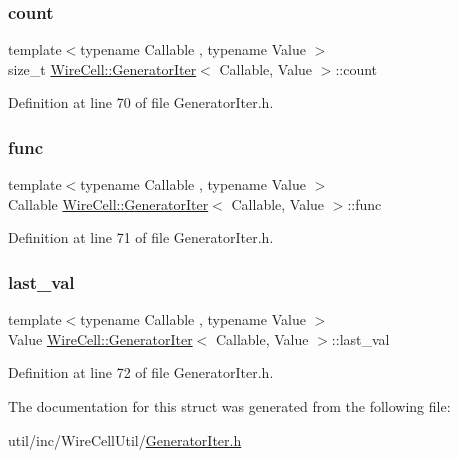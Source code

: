 \subsubsection{\texorpdfstring{count}{count}}
{\footnotesize\ttfamily template$<$typename Callable , typename Value $>$ \\
size\+\_\+t \hyperlink{struct_wire_cell_1_1_generator_iter}{Wire\+Cell\+::\+Generator\+Iter}$<$ Callable, Value $>$\+::count}



Definition at line 70 of file Generator\+Iter.\+h.

\mbox{\label{struct_wire_cell_1_1_generator_iter_a463078840ddad21cde38fa77db42ae64}} 
\subsubsection{\texorpdfstring{func}{func}}
{\footnotesize\ttfamily template$<$typename Callable , typename Value $>$ \\
Callable \hyperlink{struct_wire_cell_1_1_generator_iter}{Wire\+Cell\+::\+Generator\+Iter}$<$ Callable, Value $>$\+::func}



Definition at line 71 of file Generator\+Iter.\+h.

\mbox{\label{struct_wire_cell_1_1_generator_iter_a7b7468149505fd80fbac1ae6a1d77a33}} 
\subsubsection{\texorpdfstring{last\+\_\+val}{last\_val}}
{\footnotesize\ttfamily template$<$typename Callable , typename Value $>$ \\
Value \hyperlink{struct_wire_cell_1_1_generator_iter}{Wire\+Cell\+::\+Generator\+Iter}$<$ Callable, Value $>$\+::last\+\_\+val}



Definition at line 72 of file Generator\+Iter.\+h.



The documentation for this struct was generated from the following file\+:\begin{DoxyCompactItemize}
\item 
util/inc/\+Wire\+Cell\+Util/\hyperlink{_generator_iter_8h}{Generator\+Iter.\+h}\end{DoxyCompactItemize}
